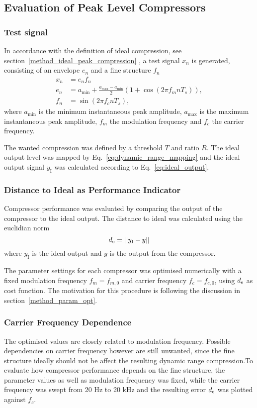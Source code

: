 \documentclass[../main2.tex]{subfiles}
\begin{document}
\subsection{Evaluation of Peak Level Compressors}\label{method_peak_compressors}
\subsubsection{Test signal}
In accordance with the definition of ideal compression, see section~\ref{method_ideal_peak_compression}
, a test signal $x_n$ is generated, consisting of an envelope $e_n$ and a fine structure $f_n$
\begin{equation}
\begin{split}
	x_n &=e_nf_n\\
	e_n &= a_\text{min} + \frac{a_\text{max}- a_\text{min}}{2} \left(1 + \cos(2 \pi f_m n T_s) \right), \\
	f_n &= \sin(2 \pi f_c n T_s),
\end{split} \label{eq:test_signal}
\end{equation}
where $a_\text{min}$ is the minimum instantaneous peak amplitude, $a_\text{max}$ is the maximum instantaneous peak amplitude, $f_m$ the modulation frequency and $f_c$ the carrier frequency.

The wanted compression was defined by a threshold $T$ and ratio $R$. The ideal output level was mapped by Eq.~\eqref{eq:dynamic_range_mapping} and the ideal output signal $y_\text{I}$ was calculated according to Eq.~\eqref{eq:ideal_output}.

\subsubsection{Distance to Ideal as Performance Indicator}
Compressor performance was evaluated by comparing the output of the compressor to the ideal output. The distance to ideal was calculated using the euclidian norm
\begin{equation}
d_\text{e} = ||y_\text{I} - y||
\end{equation}
where $y_\text{I}$ is the ideal output and $y$ is the output from the compressor.

The parameter settings for each compressor was optimised numerically with a fixed modulation frequency $f_m = f_{m,0}$ and carrier frequency $f_c = f_{c,0}$, using $d_\text{e}$ as cost function. The motivation for this procedure is following the discussion in section~\ref{method_param_opt}.

\subsubsection{Carrier Frequency Dependence}
The optimised values are closely related to modulation frequency. Possible dependencies on carrier frequency however are still unwanted, since the fine structure ideally should not be affect the resulting dynamic range compression.To evaluate how compressor performance depends on the fine structure, the parameter values as well as modulation frequency was fixed, while the carrier frequency was swept from 20 Hz to 20 kHz and the resulting error $d_\text{e}$ was plotted against $f_c$.
\end{document}

